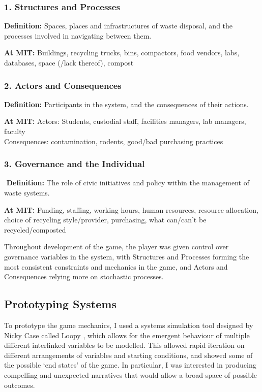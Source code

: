 \documentclass[nofonts,nols,justified,nobib]{tufte-book}
\begin{document}
\subsubsection*{1. Structures and Processes }
\textbf{Definition:} Spaces, places and infrastructures of waste disposal, and the processes involved in navigating between them.

\noindent\textbf{At MIT:} Buildings, recycling trucks, bins, compactors, food vendors, labs, databases, space (/lack thereof), compost
\subsubsection*{2. Actors and Consequences }
\textbf{Definition:} Participants in the system, and the consequences of their actions.

\noindent\textbf{At MIT:}
Actors: Students, custodial staff, facilities managers, lab managers, faculty\\
Consequences: contamination, rodents, good/bad purchasing practices
\subsubsection*{3. Governance and the Individual}
 \textbf{Definition:} The role of civic initiatives and policy within the management of waste systems.

\noindent\textbf{At MIT:} Funding, staffing, working hours, human resources, resource allocation, choice of recycling style/provider, purchasing, what can/can't be recycled/composted

Throughout development of the game, the player was given control over governance variables in the system, with Structures and Processes forming the most consistent constraints and mechanics in the game, and Actors and Consequences relying more on stochastic processes.

\subsection*{Prototyping Systems}

To prototype the game mechanics, I used a systems simulation tool designed by Nicky Case called Loopy \cite{case_loopy!_2017}, which allows for the emergent behaviour of multiple different interlinked variables to be modelled. This allowed rapid iteration on different arrangements of variables and starting conditions, and showed some of the possible `end states' of the game. In particular, I was interested in producing compelling and unexpected narratives that would allow a broad space of possible outcomes.
\end{document}
